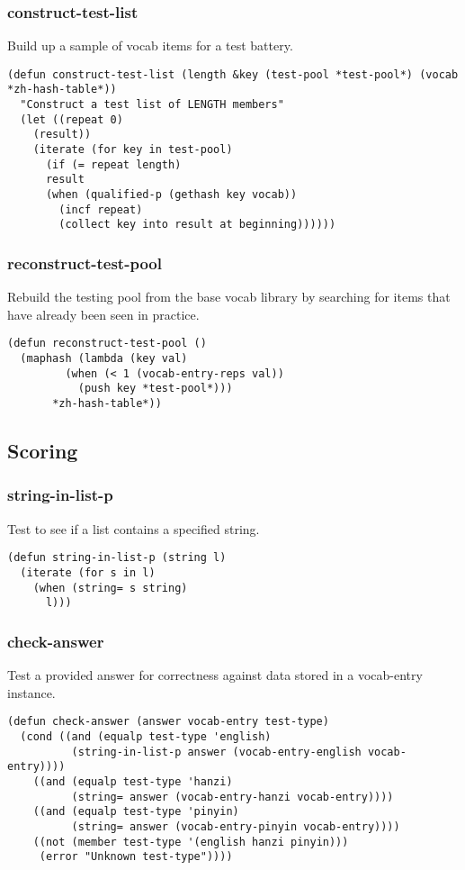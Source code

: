 \documentclass[11pt]{article}
\begin{document}
\subsubsection*{construct-test-list}
\label{sec-8-9-1}
Build up a sample of vocab items for a test battery.
\begin{verbatim}
(defun construct-test-list (length &key (test-pool *test-pool*) (vocab *zh-hash-table*))
  "Construct a test list of LENGTH members"
  (let ((repeat 0)
	(result))
    (iterate (for key in test-pool)
      (if (= repeat length)
	  result
	  (when (qualified-p (gethash key vocab))
	    (incf repeat)
	    (collect key into result at beginning))))))
\end{verbatim}
\subsubsection*{reconstruct-test-pool}
\label{sec-8-9-2}
Rebuild the testing pool from the base vocab library by searching for items that
have already been seen in practice.
\begin{verbatim}
(defun reconstruct-test-pool ()
  (maphash (lambda (key val)
	     (when (< 1 (vocab-entry-reps val))
	       (push key *test-pool*)))
	   *zh-hash-table*))
\end{verbatim}
\subsection{Scoring}
\label{sec-8-10}
\subsubsection*{string-in-list-p}
\label{sec-8-10-1}
Test to see if a list contains a specified string.
\begin{verbatim}
(defun string-in-list-p (string l)
  (iterate (for s in l)
    (when (string= s string)
      l)))
\end{verbatim}
\subsubsection*{check-answer}
\label{sec-8-10-2}
Test a provided answer for correctness against data stored in a vocab-entry instance.
\begin{verbatim}
(defun check-answer (answer vocab-entry test-type)
  (cond ((and (equalp test-type 'english)
	      (string-in-list-p answer (vocab-entry-english vocab-entry))))
	((and (equalp test-type 'hanzi)
	      (string= answer (vocab-entry-hanzi vocab-entry))))
	((and (equalp test-type 'pinyin)
	      (string= answer (vocab-entry-pinyin vocab-entry))))
	((not (member test-type '(english hanzi pinyin)))
	 (error "Unknown test-type"))))
\end{verbatim}
\end{document}
